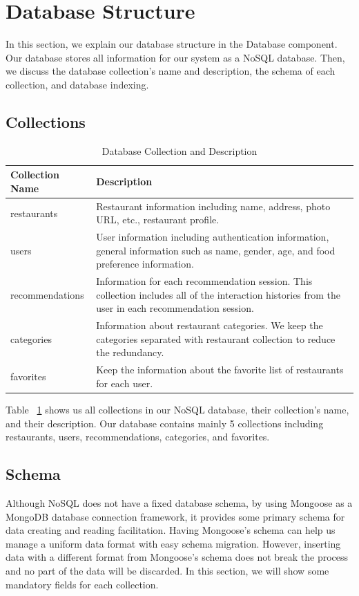 \documentclass[12pt,oneside,openright,a4paper]{cpe-english-project}
\begin{document}
\section{Database Structure}
In this section, we explain our database structure in the Database component. Our database stores all information for our system as a NoSQL database. Then, we discuss the database collection’s name and description, the schema of each collection, and database indexing.

\newpage
\subsection{Collections}
\begin{table}[!h]
\caption{Database Collection and Description}\label{tbl:3DatabaseCollectionandDescription}
\begin{tabularx}{\textwidth}{l|X} \hline\hline
Collection Name & Description \\ \hline\hline
restaurants & Restaurant information including name, address, photo URL, etc., restaurant profile. \\ \hline
users & User information including authentication information, general information such as name, gender, age, and food preference information. \\ \hline
recommendations & Information for each recommendation session. This collection includes all of the interaction histories from the user in each recommendation session. \\ \hline
categories & Information about restaurant categories. We keep the categories separated with restaurant collection to reduce the redundancy. \\ \hline
favorites & Keep the information about the favorite list of restaurants for each user. \\ \hline\hline
\end{tabularx}
\end{table}

Table ~\ref{tbl:3DatabaseCollectionandDescription} shows us all collections in our NoSQL database, their collection’s name, and their description. Our database contains mainly 5 collections including restaurants, users, recommendations, categories, and favorites.

\subsection{Schema}

Although NoSQL does not have a fixed database schema, by using Mongoose as a MongoDB database connection framework, it provides some primary schema for data creating and reading facilitation. Having Mongoose’s schema can help us manage a uniform data format with easy schema migration. However, inserting data with a different format from Mongoose’s schema does not break the process and no part of the data will be discarded. In this section, we will show some mandatory fields for each collection.
\end{document}
